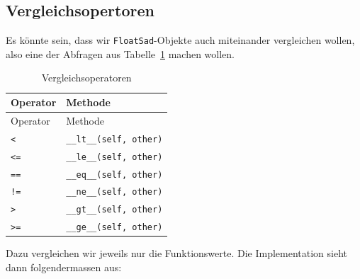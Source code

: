 \documentclass[
  letterpaper,
  DIV=11,
  oneside]{scrreprt}
\theoremstyle{definition}
\theoremstyle{definition}
\theoremstyle{remark}
\begin{document}
\hypertarget{vergleichsopertoren}{%
\subsection{Vergleichsopertoren}\label{vergleichsopertoren}}

Es könnte sein, dass wir \texttt{FloatSad}-Objekte auch miteinander
vergleichen wollen, also eine der Abfragen aus
Tabelle~\ref{tbl-Vergleichsmethoden} machen wollen.

\hypertarget{tbl-Vergleichsmethoden}{}
\begin{longtable}[]{@{}ll@{}}
\caption{\label{tbl-Vergleichsmethoden}Vergleichsoperatoren}\tabularnewline
\toprule()
Operator & Methode \\
\midrule()
\endfirsthead
\toprule()
Operator & Methode \\
\midrule()
\endhead
\texttt{\textless{}} & \texttt{\_\_lt\_\_(self,\ other)} \\
\texttt{\textless{}=} & \texttt{\_\_le\_\_(self,\ other)} \\
\texttt{==} & \texttt{\_\_eq\_\_(self,\ other)} \\
\texttt{!=} & \texttt{\_\_ne\_\_(self,\ other)} \\
\texttt{\textgreater{}} & \texttt{\_\_gt\_\_(self,\ other)} \\
\texttt{\textgreater{}=} & \texttt{\_\_ge\_\_(self,\ other)} \\
\bottomrule()
\end{longtable}

Dazu vergleichen wir jeweils nur die Funktionswerte. Die Implementation
sieht dann folgendermassen aus:
\end{document}
